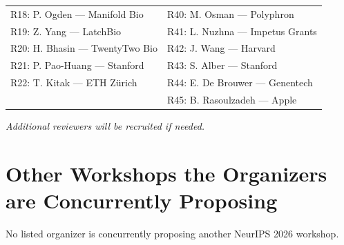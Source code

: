 \documentclass[10pt]{article}
\begin{document}
\begin{tabular}{@{}p{}p{}@{}}
R18: P. Ogden --- Manifold Bio & R40: M. Osman --- Polyphron \\

R19: Z. Yang --- LatchBio & R41: L. Nuzhna --- Impetus Grants \\

R20: H. Bhasin --- TwentyTwo Bio & R42: J. Wang --- Harvard \\

R21: P. Pao-Huang --- Stanford & R43: S. Alber --- Stanford \\

R22: T. Kitak --- ETH Zürich & R44: E. De Brouwer --- Genentech \\

& R45: B. Rasoulzadeh --- Apple
\end{tabular}

\vspace{2mm}
\textit{\noindent Additional reviewers will be recruited if needed.}

\section{Other Workshops the Organizers are Concurrently Proposing}
\label{sec:org-concurrent}
No listed organizer is concurrently proposing another NeurIPS 2026 workshop. 
\end{document}
